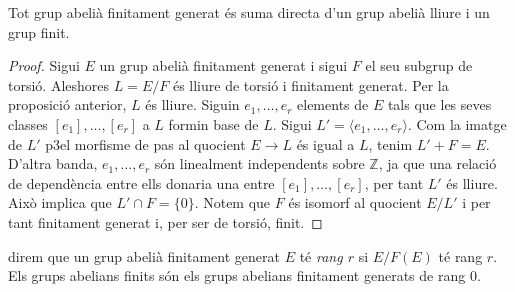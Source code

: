 \documentclass[../main.tex]{subfiles}
\begin{document}
\begin{prop}
Tot grup abelià finitament generat és suma directa d'un grup abelià lliure i un grup finit.
\end{prop}
\begin{proof}
Sigui $E$ un grup abelià finitament generat i sigui $F$ el seu subgrup de torsió. Aleshores $L = E/F$ és lliure de torsió i finitament generat. Per la proposició anterior, $L$ és lliure. Siguin $e_1,\ldots,e_r$ elements de $E$ tals que les seves classes $[e_1],\ldots,[e_r]$ a $L$ formin base de $L$. Sigui $L' = \langle e_1,\ldots,e_r\rangle$. Com la imatge de $L'$ p3el morfisme de pas al quocient $E\rightarrow L$ és igual a $L$, tenim $L'+F = E$. D'altra banda, $e_1,\ldots,e_r$ són linealment independents sobre $\mathbb{Z}$, ja que una relació de dependència entre ells donaria una entre $[e_1],\ldots,[e_r]$, per tant $L'$ és lliure. Això implica que $L'\cap F = \{0\}$. Notem que $F$ és isomorf al quocient $E/L'$ i per tant finitament generat i, per ser de torsió, finit.
\end{proof}

direm que un grup abelià finitament generat $E$ té \textit{rang $r$} si $E/F(E)$ té rang $r$. Els grups abelians finits són els grups abelians finitament generats de rang 0.
\end{document}
